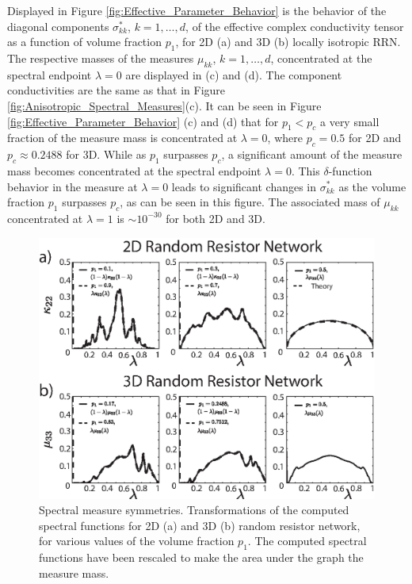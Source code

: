 \documentclass{cmslatex}
\begin{document}
Displayed in Figure \ref{fig:Effective_Parameter_Behavior} is the
behavior of the diagonal components $\sigma^*_{kk}$, $k=1,\ldots,d$, of the
effective complex conductivity tensor as a function of volume fraction
$p_1$, for 2D (a) and 3D (b) locally isotropic RRN. The respective
masses of the measures $\mu_{kk}$, $k=1,\ldots,d$, concentrated at the
spectral endpoint $\lambda=0$ are displayed in (c) and (d).  The component
conductivities are the same as that in Figure
\ref{fig:Anisotropic_Spectral_Measures}(c). It can be seen in Figure
\ref{fig:Effective_Parameter_Behavior} (c) and (d) that for $p_1<p_c$
a very small fraction of the measure mass is concentrated at
$\lambda=0$, where $p_c=0.5$ for 2D and $p_c\approx0.2488$ for 3D. While as $p_1$
surpasses $p_c$, a significant amount of the measure mass becomes
concentrated at the spectral endpoint $\lambda=0$. This $\delta$-function
behavior in the measure at $\lambda=0$ leads to significant changes in
$\sigma^*_{kk}$ as the volume fraction $p_1$ surpasses $p_c$, as can be
seen in this figure. The associated mass of $\mu_{kk}$ concentrated at
$\lambda=1$ is $\sim10^{-30}$ for both 2D and 3D. 

%
\begin{figure}[t]
  \centerline{\includegraphics[scale=0.97]{Spectral_Function_Symmetries.eps}} 
\caption{Spectral measure symmetries. Transformations of the computed
  spectral functions for 2D (a) and 3D (b) random resistor network,
  for various values of the volume fraction $p_1$. The computed
  spectral functions have been rescaled to make the area under the
  graph the measure mass.   
        }
\label{fig:Spectral_Function_Symmetries}
\end{figure}
%
\end{document}
